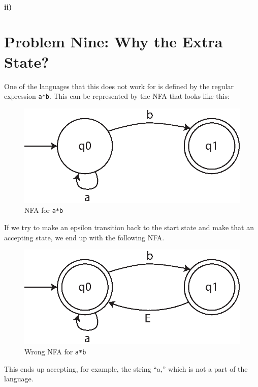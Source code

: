 \documentclass[10pt,letter]{article}
\begin{document}
\paragraph{ii)} 

\section*{Problem Nine: Why the Extra State?} 
One of the languages that this does not work for is defined by the regular expression \texttt{a*b}. This can be represented by the NFA that looks like this:

\begin{figure}[h]
\centering
  \includegraphics[width=0.45\linewidth]{9i.eps}
  \caption{NFA for \texttt{a*b}}
  \label{fig:9i}
\end{figure}

If we try to make an epsilon transition back to the start state and make that an accepting state, we end up with the following NFA.

\begin{figure}[h]
\centering
  \includegraphics[width=0.45\linewidth]{9ii.eps}
  \caption{Wrong NFA for \texttt{a*b}}
  \label{fig:9ii}
\end{figure}

This ends up accepting, for example, the string ``a,'' which is not a part of the language.



\end{document}
